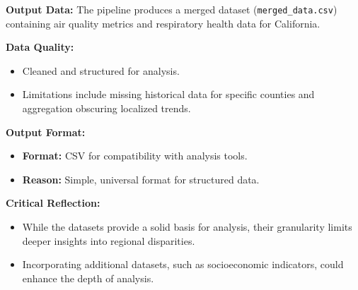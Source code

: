 \documentclass[a4paper,12pt]{article}
\begin{document}
\textbf{Output Data:}  
The pipeline produces a merged dataset (\texttt{merged\_data.csv}) containing air quality metrics and respiratory health data for California.  

\textbf{Data Quality:}
\begin{itemize}
    \item Cleaned and structured for analysis.
    \item Limitations include missing historical data for specific counties and aggregation obscuring localized trends.
\end{itemize}

\textbf{Output Format:}
\begin{itemize}
    \item \textbf{Format:} CSV for compatibility with analysis tools.
    \item \textbf{Reason:} Simple, universal format for structured data.
\end{itemize}

\textbf{Critical Reflection:}
\begin{itemize}
    \item While the datasets provide a solid basis for analysis, their granularity limits deeper insights into regional disparities.
    \item Incorporating additional datasets, such as socioeconomic indicators, could enhance the depth of analysis.
\end{itemize}
\end{document}
